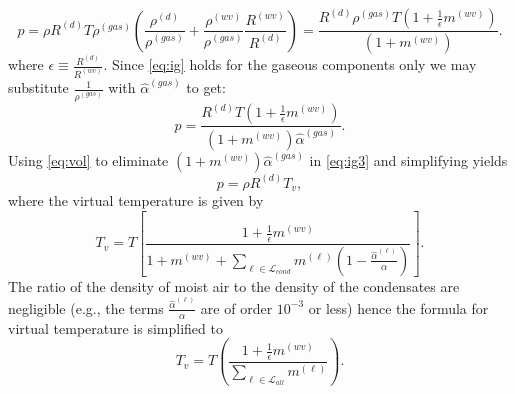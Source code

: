 \documentclass{agujournal}
\begin{document}
{\begin{equation}
p=\rho R^{(d)} T\rho^{(gas)}\left( \frac{\rho^{(d)}}{\rho^{(gas)}}+\frac{\rho^{(wv)}}{\rho^{(gas)}}\frac{R^{(wv)}}{R^{(d)}}\right)=\frac{R^{(d)} \rho^{(gas)}T\left( 1+\frac{1}{\epsilon}m^{(wv)}\right)}{\left(1+m^{(wv)}\right)}\label{eq:ig2}.
\end{equation}
where $\epsilon\equiv \frac{R^{(d)}}{R^{(wv)}}$. Since \eqref{eq:ig} holds for the gaseous components only we may substitute $\frac{1}{\rho^{(gas)}}$ with $\hat{\alpha}^{(gas)}$ to get:
\begin{equation}
p=\frac{R^{(d)} T\left( 1+\frac{1}{\epsilon}m^{(wv)}\right)}{\left(1+m^{(wv)}\right)\hat{\alpha}^{(gas)}}\label{eq:ig3}.
\end{equation}
Using \eqref{eq:vol} to eliminate $\left(1+m^{(wv)}\right)\hat{\alpha}^{(gas)}$ in \eqref{eq:ig3} and simplifying yields
\begin{equation}
p=\rho R^{(d)} T_v\label{eq:igl},
\end{equation}
where the virtual temperature is given by
\begin{equation}
T_v =T\left[ \frac{1+\frac{1}{\epsilon}m^{(wv)}}{1+m^{(wv)}+\sum_{\ell\in \mathcal{L}_{cond}}m^{(\ell)}\left(1-\frac{\hat{\alpha}^{(\ell)}}{\alpha}\right)}\right].
\end{equation}
The ratio of the density of moist air to the density of the condensates are negligible (e.g., the terms $\frac{\hat{\alpha}^{(\ell)}}{\alpha}$ are of order $10^{-3}$ or less) hence the formula for virtual temperature is simplified to
\begin{equation}
T_v =T\left( \frac{1+\frac{1}{\epsilon}m^{(wv)}}{\sum_{\ell \in \mathcal{L}_{all}}m^{(\ell)}}\right).\label{eq:tv}
\end{equation}
}
\end{document}
